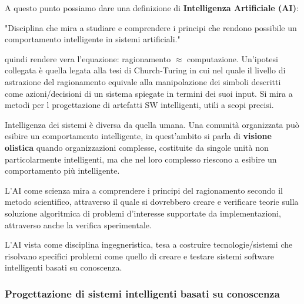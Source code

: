 \documentclass[a4paper]{extarticle}
\begin{document}
A questo punto possiamo dare una definizione di \textbf{Intelligenza Artificiale (AI)}:
\begin{center}
	"Disciplina che mira a studiare e comprendere i principi che rendono possibile un comportamento intelligente in sistemi artificiali."
\end{center}
quindi rendere vera l'equazione: ragionamento $\approx$ computazione. Un'ipotesi collegata è quella legata alla tesi di Church-Turing in cui nel quale il livello di astrazione del ragionamento equivale alla manipolazione dei simboli descritti come azioni/decisioni di un sistema spiegate in termini dei suoi input. Si mira a metodi per l progettazione di artefatti SW intelligenti, utili a scopi precisi.

Intelligenza dei sistemi è diversa da quella umana. Una comunità organizzata può esibire un comportamento intelligente, in quest'ambito si parla di \textbf{visione olistica} quando organizzazioni complesse, costituite da singole unità non particolarmente intelligenti, ma che nel loro complesso riescono a esibire un comportamento più intelligente.

L'AI come scienza mira a comprendere i principi del ragionamento secondo il metodo scientifico, attraverso il quale si dovrebbero creare e verificare teorie sulla soluzione algoritmica di problemi d'interesse supportate da implementazioni, attraverso anche la verifica sperimentale.

L'AI vista come disciplina ingegneristica, tesa a costruire tecnologie/sistemi che risolvano specifici problemi come quello di creare e testare sistemi software intelligenti basati su conoscenza.

\subsubsection{Progettazione di sistemi intelligenti basati su conoscenza}
\end{document}
